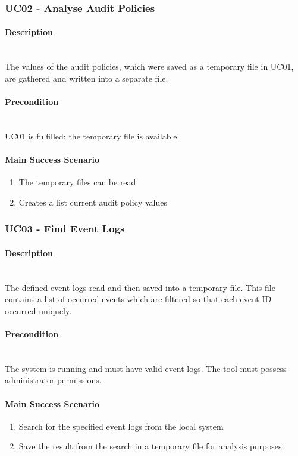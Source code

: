\subsubsection{UC02 - Analyse Audit Policies}\label{UC02}
\begin{tcolorbox}
    \paragraph{Description} \ \\
    The values of the audit policies, which were saved as a temporary file in UC01, are gathered and written into a separate file.
    \ \\
    \paragraph{Precondition} \ \\
    UC01 is fulfilled: the temporary file is available.
    \ \\
    \paragraph{Main Success Scenario} 
    \begin{enumerate}
        \item The temporary files can be read
        \item Creates a list current audit policy values
    \end{enumerate}   
\end{tcolorbox}
\subsubsection{UC03 - Find Event Logs}\label{UC03}
\begin{tcolorbox}
    \paragraph{Description} \ \\
    The defined event logs read and then saved into a temporary file. This file contains a list of occurred events which are filtered so that each event ID occurred uniquely.
    \ \\
    \paragraph{Precondition} \ \\
    The system is running and must have valid event logs. The tool must possess administrator permissions.
    \ \\
    \paragraph{Main Success Scenario} 
    \begin{enumerate}
        \item Search for the specified event logs from the local system
        \item Save the result from the search in a temporary file for analysis purposes.
    \end{enumerate}
\end{tcolorbox}


